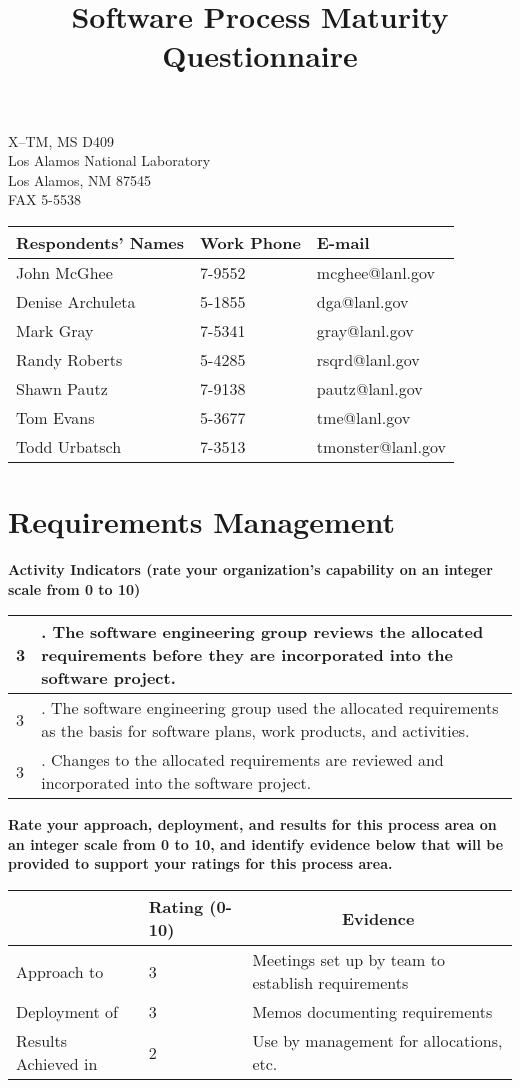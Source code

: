 \documentclass{article}
\title{Software Process Maturity Questionnaire}
\newcommand{\KPAname}{}
\newenvironment{KPARate}[1]
	{\renewcommand{\KPAname}{#1}
	 {\bf Rate your approach, deployment, and results for
	  this process area on an integer scale from 0 to 10, and 
	  identify evidence below that will be provided to support your
	  ratings for this process area.}
	 \begin{center}
	 \begin{tabular}{|p{1.0in}|p{0.5in}|p{5.0in}|} \hline
	 & Rating (0-10) & \multicolumn{1}{c|}{Evidence} \\ \hline}
	{\end{tabular}
	 \end{center}}
\newcommand{\Approach}[2]{Approach to \KPAname & #1 & #2 \\ \hline}
\newcommand{\Deployment}[2]{Deployment of \KPAname & #1 & #2 \\ \hline}
\newcommand{\Results}[2]{Results Achieved in \KPAname & #1 & #2 \\
	\hline}
\newcounter{activity}
\newenvironment{KPAActivity}
	{
	 \setcounter{activity}{0}
	 {\bf Activity Indicators (rate your organization's capability
	 on an integer scale from 0 to 10)}
	 \begin{center}
	 \begin{tabular}{|p{0.5in}|p{6.0in}|} \hline
	}
	{
	 \end{tabular}
	 \end{center}
	}
\newcommand{\Activity}[2]{\stepcounter{activity} #1 &
\arabic{activity}. #2 \\ \hline}
\begin{document}
\maketitle
\begin{center}
\parbox{35ex}{X--TM, MS D409\\
Los Alamos National Laboratory\\
Los Alamos, NM 87545\\
FAX 5-5538\\}

\begin{tabular}{|l|l|l|} \hline
{\bf Respondents' Names} & {\bf Work Phone} & {\bf E-mail} \\ \hline
John McGhee              & 7-9552           & mcghee@lanl.gov \\
Denise Archuleta         & 5-1855           & dga@lanl.gov \\
Mark Gray                & 7-5341           & gray@lanl.gov \\
Randy Roberts            & 5-4285           & rsqrd@lanl.gov \\
Shawn Pautz              & 7-9138           & pautz@lanl.gov \\
Tom Evans                & 5-3677           & tme@lanl.gov \\
Todd Urbatsch            & 7-3513           & tmonster@lanl.gov \\ \hline
\end{tabular}
\end{center}

\newpage
\section{Requirements Management}

\begin{KPAActivity}
\Activity{3}{The software engineering group reviews the allocated
requirements before they are incorporated into the software project.}
\Activity{3}{The software engineering group used the allocated
requirements as the basis for software plans, work products, and
activities.}
\Activity{3}{Changes to the allocated requirements are reviewed and
incorporated into the software project.}
\end{KPAActivity}

\begin{KPARate}{Requirements Management}
\Approach{3}{Meetings set up by team to establish requirements}
\Deployment{3}{Memos documenting requirements}
\Results{2}{Use by management for allocations, etc.}
\end{KPARate}
\end{document}
